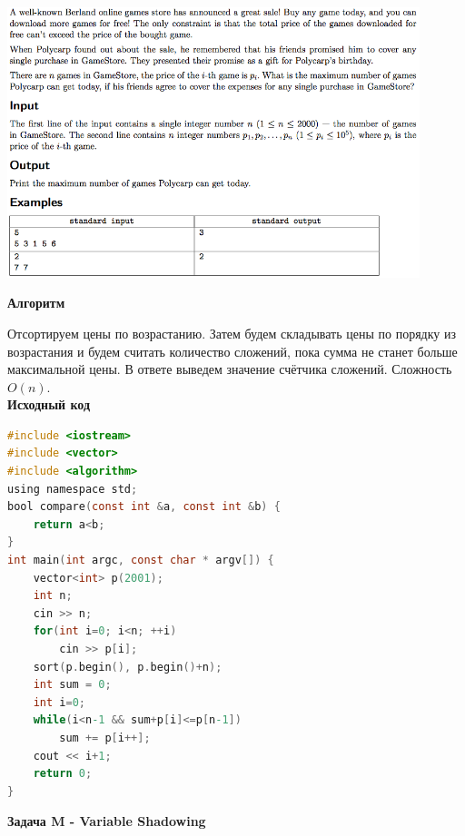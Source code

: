 \documentclass[a4paper,12pt]{article}
\begin{document}
\begin{center}
\includegraphics[width=0.9\textwidth]{CT_ACM_WEST/CT_ACM_WEST_I.png}\\ [1cm]
\end{center}

\textbf{{\large Алгоритм}}

Отсортируем цены по возрастанию. Затем будем складывать цены по порядку из возрастания и будем считать количество сложений, пока сумма не станет больше максимальной цены. В ответе выведем значение счётчика сложений. Сложность $O(n)$. \\

\textbf{{\large Исходный код}} \\
\begin{lstlisting}[language=C]
#include <iostream>
#include <vector>
#include <algorithm>
using namespace std;
bool compare(const int &a, const int &b) {
    return a<b;
}
int main(int argc, const char * argv[]) {
    vector<int> p(2001);
    int n;
    cin >> n;
    for(int i=0; i<n; ++i)
        cin >> p[i];
    sort(p.begin(), p.begin()+n);
    int sum = 0;
    int i=0;
    while(i<n-1 && sum+p[i]<=p[n-1])
        sum += p[i++];
    cout << i+1;
    return 0;
}
\end{lstlisting}

\newpage
\textbf{{\large Задача M - Variable Shadowing}}
\end{document}
